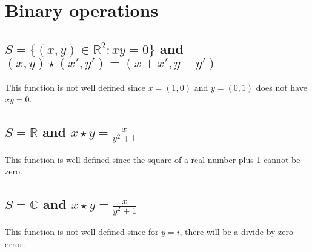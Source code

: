 \section{Binary operations}
\subsection{$S = \{(x,y) \in \mathbb{R}^2 : xy = 0\}$ and $(x, y) \star (x', y') = (x+x', y+y')$}
This function is not well defined since $x = (1,0)$ and $y =(0,1)$ does not have $xy = 0$.

\subsection{$S = \mathbb{R}$ and $x \star y = \frac{x}{y^2+1}$}
This function is well-defined since the square of a real number plus 1 cannot be zero.

\subsection{$S = \mathbb{C}$ and $x \star y = \frac{x}{y^2+1}$}
This function is not well-defined since for $y = i$, there will be a divide by zero error.